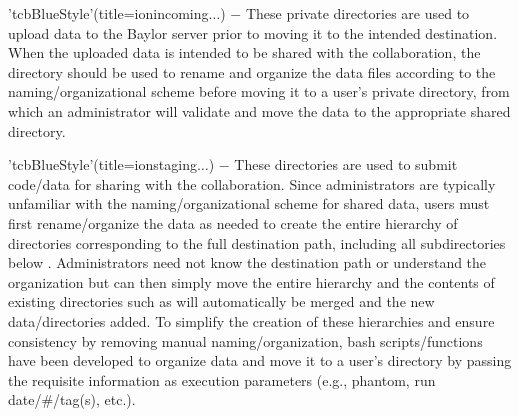\begin{tcbfunctionenv}
\begin{tcbparagraph}
\end{tcbparagraph}
\begin{tcbparagraph}'tcbBlueStyle'(title=\dirsep ion\dirsep incoming\dirsep\usernamelabel\dirsep$\dots$)
$\boldsymbol{-}$ These private directories are used to upload data to the Baylor server prior to moving it to the intended destination.  When the uploaded data is intended to be shared with the collaboration, the directory should be used to rename and organize the data files according to the naming/organizational scheme before moving it to a user's private  directory, from which an administrator will validate and move the data to the appropriate shared directory.
\end{tcbparagraph}
\begin{tcbparagraph}'tcbBlueStyle'(title=\dirsep ion\dirsep staging\dirsep\usernamelabel\dirsep$\dots$)
$\boldsymbol{-}$ These directories are used to submit code/data for sharing with the collaboration.  Since administrators are typically unfamiliar with the naming/organizational scheme for shared data, users must first rename/organize the data as needed to create the entire hierarchy of directories corresponding to the full destination path, including all subdirectories below .  Administrators need not know the destination path or understand the organization but can then simply move the entire hierarchy and the contents of existing directories such as  will automatically be merged and the new data/directories added.  To simplify the creation of these hierarchies and ensure consistency by removing manual naming/organization, bash scripts/functions have been developed to organize data and move it to a user's  directory by passing the requisite information as execution parameters (e.g., phantom, run date/\#/tag(s), etc.).\\[\tcbparskip]

\end{tcbparagraph}
\end{tcbfunctionenv}
